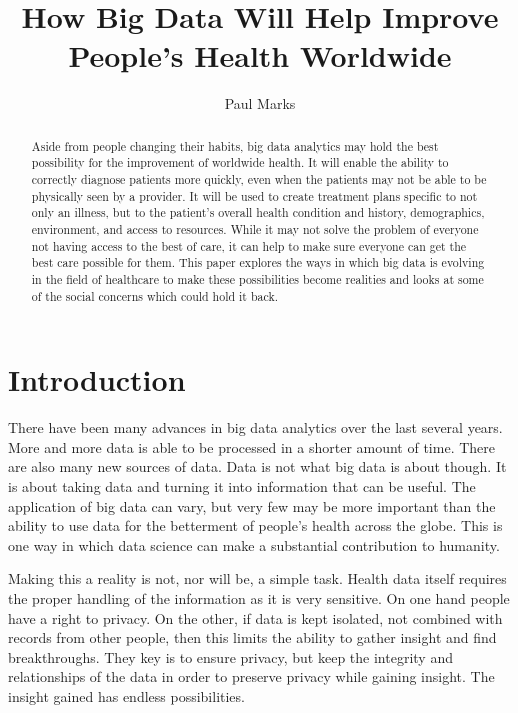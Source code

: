 \documentclass[sigconf]{acmart}
\begin{document}
\title{How Big Data Will Help Improve People's Health Worldwide}


\author{Paul Marks}


\begin{abstract}
Aside from people changing their habits, big data analytics
may hold the best possibility for the improvement of
worldwide health.  It will enable the ability to correctly
diagnose patients more quickly, even when the patients may
not be able to be physically seen by a provider.  It will
be used to create treatment plans specific to not only an
illness, but to the patient's overall health condition and
history, demographics, environment, and access to resources.
While it may not solve the problem of everyone not having
access to the best of care, it can help to make sure everyone
can get the best care possible for them.  This paper explores
the ways in which big data is evolving in the field of
healthcare to make these possibilities become realities and
looks at some of the social concerns which could hold it back.
\end{abstract}



\maketitle

\section{Introduction}
There have been many advances in big data analytics over the last 
several years.  More and more data is able to be processed in a 
shorter amount of time.  There are also many new sources of data.  
Data is not what big data is about though.  It is about taking 
data and turning it into information that can be useful.  The 
application of big data can vary, but very few may be more 
important than the ability to use data for the betterment of 
people's health across the globe.  This is one way in which data 
science can make a substantial contribution to humanity.

Making this a reality is not, nor will be, a simple task.  Health 
data itself requires the proper handling of the information as 
it is very sensitive.  On one hand people have a right to privacy.  
On the other, if data is kept isolated, not combined with records 
from other people, then this limits the ability to gather insight 
and find breakthroughs.  They key is to ensure privacy, but keep 
the integrity and relationships of the data in order to preserve 
privacy while gaining insight.  The insight gained has endless 
possibilities.
\end{document}
